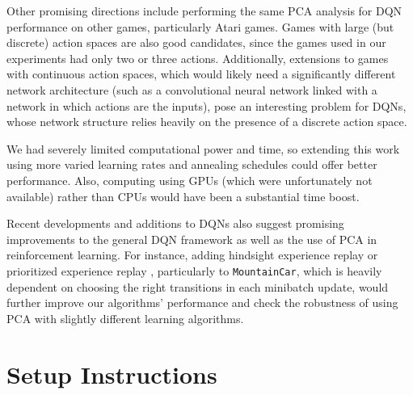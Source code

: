 \documentclass[11pt]{article}
\newcommand{\mc}{\texttt{MountainCar}}
\begin{document}
Other promising directions include performing the same PCA analysis for DQN performance on other games, particularly Atari games. Games with large (but discrete) action spaces are also good candidates, since the games used in our experiments had only two or three actions. Additionally, extensions to games with continuous action spaces, which would likely need a significantly different network architecture (such as a convolutional neural network linked with a network in which actions are the inputs), pose an interesting problem for DQNs, whose network structure relies heavily on the presence of a discrete action space.

We had severely limited computational power and time, so extending this work using more varied learning rates and annealing schedules could offer better performance. Also, computing using GPUs (which were unfortunately not available) rather than CPUs would have been a substantial time boost.

Recent developments and additions to DQNs also suggest promising improvements to the general DQN framework as well as the use of PCA in reinforcement learning. For instance, adding hindsight experience replay \cite{andrychowicz2017hindsight} or prioritized experience replay \cite{schaul2015prioritized}, particularly to \mc, which is heavily dependent on choosing the right transitions in each minibatch update, would further improve our algorithms' performance and check the robustness of using PCA with slightly different learning algorithms.

\newpage
{}


\onecolumn

\appendix

\section{Setup Instructions}
\label{app:getting_started}
\end{document}
